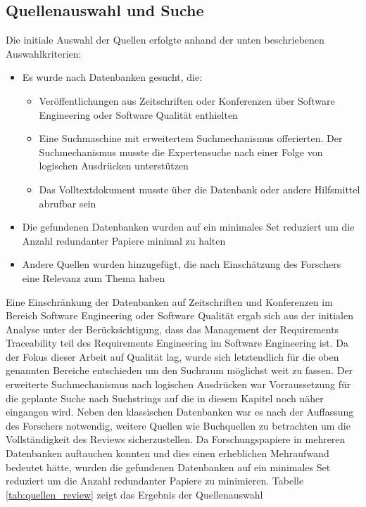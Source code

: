 
\subsection{Quellenauswahl und Suche}
\label{subsec:Quellenauswahl}

Die initiale Auswahl der Quellen erfolgte anhand der unten beschriebenen Auswahlkriterien:

\begin{itemize}
    \item Es wurde nach Datenbanken gesucht, die:
        \begin{itemize}
            \item Veröffentlichungen aus Zeitschriften oder Konferenzen über Software Engineering oder Software Qualität enthielten
            \item Eine Suchmaschine mit erweitertem Suchmechanismus offerierten. Der Suchmechanismus musste die Expertensuche nach einer Folge von logischen Ausdrücken unterstützen
            \item Das Volltextdokument musste über die Datenbank oder andere Hilfsmittel abrufbar sein
        \end{itemize}
    \item Die gefundenen Datenbanken wurden auf ein minimales Set reduziert um die Anzahl redundanter Papiere minimal zu halten
    \item Andere Quellen wurden hinzugefügt, die nach Einschätzung des Forschers eine Relevanz zum Thema haben
\end{itemize}

Eine Einschränkung der Datenbanken auf Zeitschriften und Konferenzen im Bereich Software Engineering oder Software Qualität ergab sich aus der initialen Analyse unter der Berücksichtigung, dass das Management der Requirements Traceability teil des Requirements Engineering im Software Engineering ist. Da der Fokus dieser Arbeit auf Qualität lag, wurde sich letztendlich für die oben genannten Bereiche entschieden um den Suchraum möglichst weit zu fassen. Der erweiterte Suchmechanismus nach logischen Ausdrücken war Vorraussetzung für die geplante Suche nach Suchstrings auf die in diesem Kapitel noch näher eingangen wird. Neben den klassischen Datenbanken war es nach der Auffassung des Forschers notwendig, weitere Quellen wie Buchquellen zu betrachten um die Vollständigkeit des Reviews sicherzustellen. Da Forschungspapiere in mehreren Datenbanken auftauchen konnten und dies einen erheblichen Mehraufwand bedeutet hätte, wurden die gefundenen Datenbanken auf ein minimales Set reduziert um die Anzahl redundanter Papiere zu minimieren. Tabelle \ref{tab:quellen_review} zeigt das Ergebnis der Quellenauswahl


